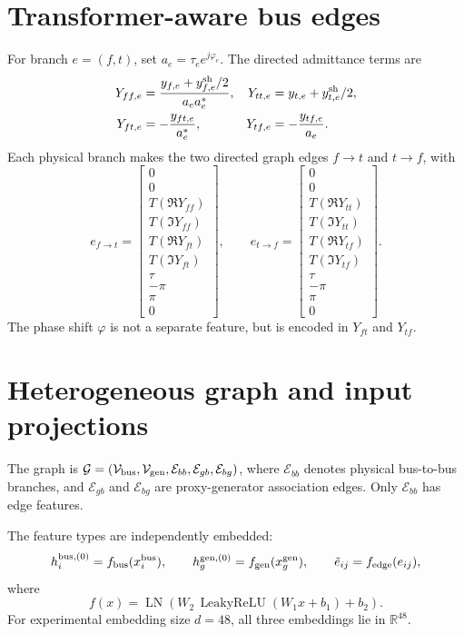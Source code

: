 \documentclass[11pt,a4paper]{article}
\newcommand{\R}{\mathbb{R}}
\newcommand{\LN}{\operatorname{LN}}
\begin{document}
\section{Transformer-aware bus edges}
For branch $e=(f,t)$, set $a_e=\tau_e e^{j\varphi_e}$. The directed admittance terms are
\begin{align*}
Y_{ff,e}&=\frac{y_{f,e}+y_{f,e}^{\rm sh}/2}{a_ea_e^*}, &
Y_{tt,e}&=y_{t,e}+y_{t,e}^{\rm sh}/2,\\
Y_{ft,e}&=-\frac{y_{ft,e}}{a_e^*}, &
Y_{tf,e}&=-\frac{y_{tf,e}}{a_e}.
\end{align*}
Each physical branch makes the two directed graph edges $f\to t$ and $t\to f$, with
\[
e_{f\to t}=\begin{bmatrix}0\\0\\T(\Re Y_{ff})\\T(\Im Y_{ff})\\T(\Re Y_{ft})\\T(\Im Y_{ft})\\\tau\\-\pi\\\pi\\0\end{bmatrix},\qquad
e_{t\to f}=\begin{bmatrix}0\\0\\T(\Re Y_{tt})\\T(\Im Y_{tt})\\T(\Re Y_{tf})\\T(\Im Y_{tf})\\\tau\\-\pi\\\pi\\0\end{bmatrix}.
\]
The phase shift $\varphi$ is not a separate feature, but is encoded in $Y_{ft}$ and $Y_{tf}$.

\section{Heterogeneous graph and input projections}
The graph is $\mathcal G=(\mathcal V_{\rm bus},\mathcal V_{\rm gen},\mathcal E_{bb},\mathcal E_{gb},\mathcal E_{bg})$, where $\mathcal E_{bb}$ denotes physical bus-to-bus branches, and $\mathcal E_{gb}$ and $\mathcal E_{bg}$ are proxy-generator association edges. Only $\mathcal E_{bb}$ has edge features.

The feature types are independently embedded:
\[
h_i^{\rm bus,(0)}=f_{\rm bus}(x_i^{\rm bus}),\qquad h_g^{\rm gen,(0)}=f_{\rm gen}(x_g^{\rm gen}),\qquad \tilde e_{ij}=f_{\rm edge}(e_{ij}),
\]
where
\[
f(x)=\LN\!\left(W_2\,\operatorname{LeakyReLU}(W_1x+b_1)+b_2\right).
\]
For experimental embedding size $d=48$, all three embeddings lie in $\R^{48}$.
\end{document}
